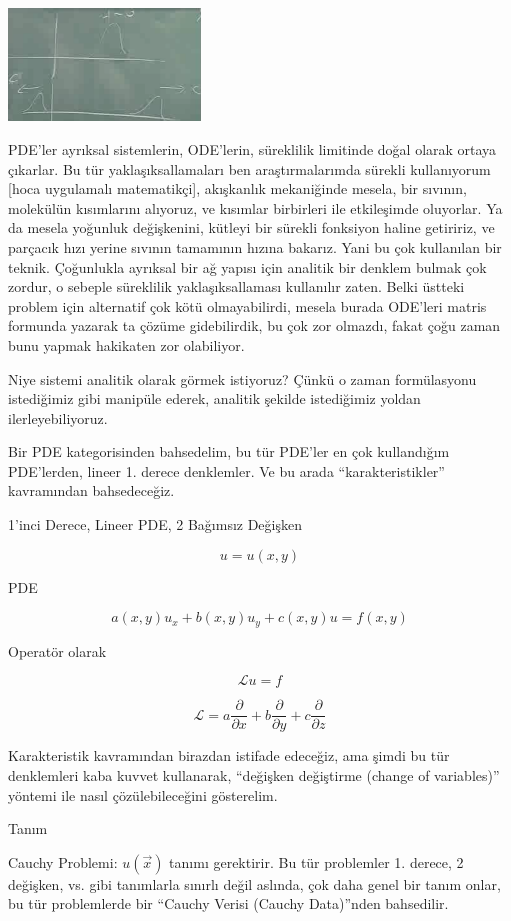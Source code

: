 \documentclass[12pt,fleqn]{article}\usepackage{../../common}
\begin{document}
\includegraphics[height=3cm]{1_10.png}

PDE'ler ayrıksal sistemlerin, ODE'lerin, süreklilik limitinde doğal olarak
ortaya çıkarlar. Bu tür yaklaşıksallamaları ben araştırmalarımda sürekli
kullanıyorum [hoca uygulamalı matematikçi], akışkanlık mekaniğinde mesela,
bir sıvının, molekülün kısımlarını alıyoruz, ve kısımlar birbirleri ile
etkileşimde oluyorlar. Ya da mesela yoğunluk değişkenini, kütleyi bir
sürekli fonksiyon haline getiririz, ve parçacık hızı yerine sıvının
tamamının hızına bakarız. Yani bu çok kullanılan bir teknik. Çoğunlukla
ayrıksal bir ağ yapısı için analitik bir denklem bulmak çok zordur, o
sebeple süreklilik yaklaşıksallaması kullanılır zaten. Belki üstteki
problem için alternatif çok kötü olmayabilirdi, mesela burada ODE'leri
matris formunda yazarak ta çözüme gidebilirdik, bu çok zor olmazdı, fakat
çoğu zaman bunu yapmak hakikaten zor olabiliyor.

Niye sistemi analitik olarak görmek istiyoruz? Çünkü o zaman formülasyonu
istediğimiz gibi manipüle ederek, analitik şekilde istediğimiz yoldan
ilerleyebiliyoruz.

Bir PDE kategorisinden bahsedelim, bu tür PDE'ler en çok kullandığım
PDE'lerden, lineer 1. derece denklemler. Ve bu arada ``karakteristikler''
kavramından bahsedeceğiz. 

1'inci Derece, Lineer PDE, 2 Bağımsız Değişken

$$ u = u(x,y) $$

PDE

$$ a(x,y)u_x + b(x,y)u_y + c(x,y)u = f(x,y) $$

Operatör olarak 

$$ \mathcal{L}u = f $$

$$ \mathcal{L} = a \frac{\partial }{\partial x} +
b \frac{\partial }{\partial y} +
c \frac{\partial }{\partial z} 
$$

Karakteristik kavramından birazdan istifade edeceğiz, ama şimdi bu tür
denklemleri kaba kuvvet kullanarak, ``değişken değiştirme (change of
variables)'' yöntemi ile nasıl çözülebileceğini gösterelim. 

Tanım

Cauchy Problemi: $u(\vec{x})$ tanımı gerektirir. Bu tür problemler
1. derece, 2 değişken, vs. gibi tanımlarla sınırlı değil aslında, çok daha
genel bir tanım onlar, bu tür problemlerde bir ``Cauchy Verisi (Cauchy
Data)''nden bahsedilir.
\end{document}
